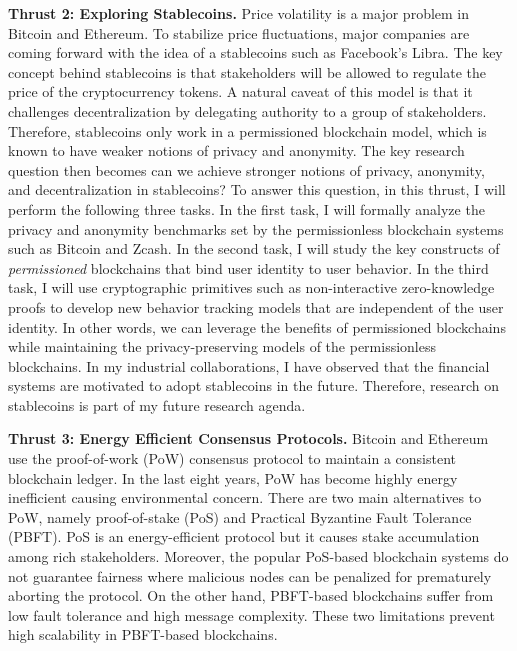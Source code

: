 \documentclass{NSF}
\newcommand{\BfPara}[1]{{\noindent\textbf{#1.}}\xspace}
\begin{document}
\vspace{2mm}
\BfPara{Thrust 2: Exploring Stablecoins} Price volatility is a major problem in Bitcoin and Ethereum. To stabilize price fluctuations, major companies are coming forward with the idea of a stablecoins such as Facebook's Libra. The key concept behind stablecoins is that stakeholders will be allowed to regulate the price of the cryptocurrency tokens. A natural caveat of this model is that it challenges decentralization by delegating authority to a group of stakeholders. Therefore, stablecoins only work in a permissioned blockchain model, which is known to have weaker notions of privacy and anonymity. The key research question then becomes can we achieve stronger notions of privacy, anonymity, and decentralization in stablecoins? To answer this question, in this thrust, I will perform the following three tasks. In the first task, I will formally analyze the privacy and anonymity benchmarks set by the permissionless blockchain systems such as Bitcoin and Zcash. In the second task, I will study the key constructs of {\em permissioned} blockchains that bind user identity to user behavior. In the third task, I will use cryptographic primitives such as non-interactive zero-knowledge proofs to develop new behavior tracking models that are independent of the user identity. In other words, we can leverage the benefits of permissioned blockchains while maintaining the privacy-preserving models of the permissionless blockchains. In my industrial collaborations, I have observed that the financial systems are motivated to adopt stablecoins in the future. Therefore, research on stablecoins is part of my future research agenda. 


\vspace{2mm}
\BfPara{Thrust 3: Energy Efficient Consensus Protocols} Bitcoin and Ethereum use the proof-of-work (PoW) consensus protocol to maintain a consistent blockchain ledger. In the last eight years, PoW has become highly energy inefficient causing environmental concern. There are two main alternatives to PoW, namely proof-of-stake (PoS) and Practical Byzantine Fault Tolerance (PBFT). PoS is an energy-efficient protocol but it causes stake accumulation among rich stakeholders. Moreover, the popular PoS-based blockchain systems do not guarantee fairness where malicious nodes can be penalized for prematurely aborting the protocol. On the other hand, PBFT-based blockchains suffer from low fault tolerance and high message complexity. These two limitations prevent high scalability in PBFT-based blockchains. 
\end{document}
